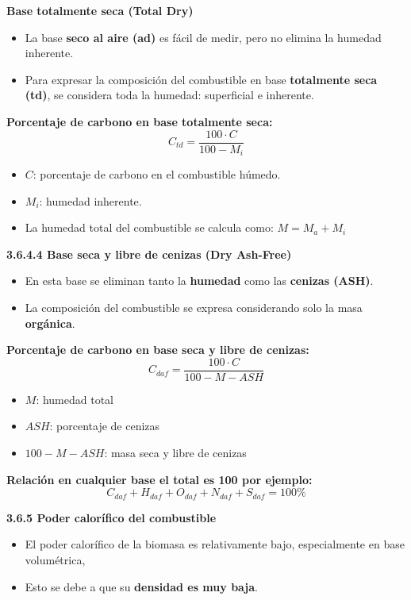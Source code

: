 \documentclass[../../main.tex]{subfiles}
\begin{document}
\begin{frame}{\textbf{Base totalmente seca (Total Dry)}}
\begin{itemize}
    \item La base \textbf{seco al aire (ad)} es f\'acil de medir, pero no elimina la humedad inherente.
    \item Para expresar la composici\'on del combustible en base \textbf{totalmente seca (td)}, se considera toda la humedad: superficial e inherente.
\end{itemize}

\textbf{Porcentaje de carbono en base totalmente seca:}
\[
C_{td} = \frac{100 \cdot C}{100 - M_i} 
\]

\begin{itemize}
    \item $C$: porcentaje de carbono en el combustible h\'umedo.
    \item $M_i$: humedad inherente.
    \item La humedad total del combustible se calcula como: \( M = M_a + M_i \)
\end{itemize}
\end{frame}

\begin{frame}{\textbf{3.6.4.4 Base seca y libre de cenizas (Dry Ash-Free)}}
\begin{itemize}
    \item En esta base se eliminan tanto la \textbf{humedad} como las \textbf{cenizas (ASH)}.
    \item La composici\'on del combustible se expresa considerando solo la masa \textbf{org\'anica}.
\end{itemize}

\textbf{Porcentaje de carbono en base seca y libre de cenizas:}
\[
C_{daf} = \frac{100 \cdot C}{100 - M - ASH} 
\]

\begin{itemize}
    \item $M$: humedad total
    \item $ASH$: porcentaje de cenizas
    \item $100 - M - ASH$: masa seca y libre de cenizas
\end{itemize}

\textbf{Relaci\'on en cualquier base el total es 100 por ejemplo:}
\[
C_{daf} + H_{daf} + O_{daf} + N_{daf} + S_{daf} = 100\% 
\]
\end{frame}

\begin{frame}{\textbf{3.6.5 Poder calor\'ifico del combustible}}
\begin{itemize}
    \item El poder calor\'ifico de la biomasa es relativamente bajo, especialmente en base volum\'etrica,
    \item Esto se debe a que su \textbf{densidad es muy baja}.
\end{itemize}
\end{frame}
\end{document}
